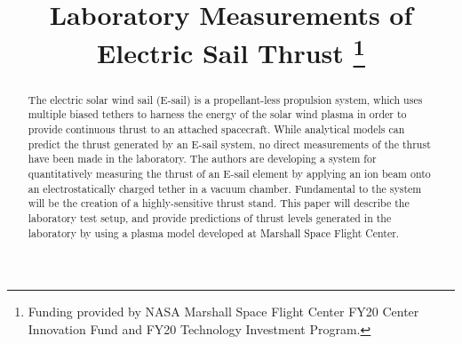 \documentclass[conference]{IEEEtran}
\begin{document}
\title{Laboratory Measurements of Electric Sail Thrust
\thanks{Funding provided by NASA Marshall Space Flight Center FY20 Center Innovation Fund and FY20 Technology Investment Program.}}

\author{
\and
{}
\and
{}
\and
{}
\and
{}
\and
{}
}

\maketitle

\begin{abstract}
The electric solar wind sail (E-sail) is a propellant-less propulsion system, which uses multiple biased tethers to harness the energy of the solar wind plasma in order to provide continuous thrust to an attached spacecraft. While analytical models can predict the thrust generated by an E-sail system, no direct measurements of the thrust have been made in the laboratory. The authors are developing a system for quantitatively measuring the thrust of an E-sail element by applying an ion beam onto an electrostatically charged tether in a vacuum chamber. Fundamental to the system will be the creation of a highly-sensitive thrust stand. This paper will describe the laboratory test setup, and provide predictions of thrust levels generated in the laboratory by using a plasma model developed at Marshall Space Flight Center.
\end{abstract}
\end{document}
